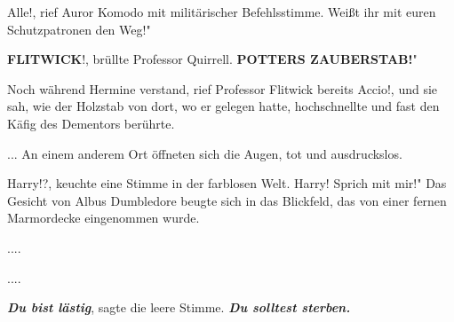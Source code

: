 \glqq{}Alle!\grqq{}, rief Auror Komodo mit militärischer Befehlsstimme. \glqq{}
Weißt ihr mit euren Schutzpatronen den Weg!"

\glqq{}\textbf{FLITWICK}!\grqq{}, brüllte Professor Quirrell. \glqq{}
\textbf{POTTERS ZAUBERSTAB!}"

Noch während Hermine verstand, rief Professor Flitwick bereits \glqq{}
Accio!\grqq{}, und sie sah, wie der Holzstab von dort, wo er gelegen hatte,
hochschnellte und fast den Käfig des Dementors berührte.

... An einem anderem Ort öffneten sich die Augen, tot und ausdruckslos.

\glqq{}Harry!?\grqq{}, keuchte eine Stimme in der farblosen Welt. \glqq{}Harry!
Sprich mit mir!" Das Gesicht von Albus Dumbledore beugte sich in das Blickfeld,
das von einer fernen Marmordecke eingenommen wurde.

....

....

\textbf{\emph{Du bist lästig}}\grqq{}, sagte die leere Stimme.
\glqq{}\textbf{\emph{Du solltest sterben.}}

